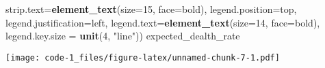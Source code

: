 \documentclass[
]{article}
\newenvironment{Shaded}{\begin{snugshade}}{\end{snugshade}}
\newcommand{\AttributeTok}[1]{\textcolor[rgb]{0.13,0.29,0.53}{#1}}
\newcommand{\DecValTok}[1]{\textcolor[rgb]{0.00,0.00,0.81}{#1}}
\newcommand{\FunctionTok}[1]{\textcolor[rgb]{0.13,0.29,0.53}{\textbf{#1}}}
\newcommand{\NormalTok}[1]{#1}
\newcommand{\StringTok}[1]{\textcolor[rgb]{0.31,0.60,0.02}{#1}}
\begin{document}
\begin{Shaded}
\begin{Highlighting}[]
        \AttributeTok{strip.text=}\FunctionTok{element\_text}\NormalTok{(}\AttributeTok{size=}\DecValTok{15}\NormalTok{, }\AttributeTok{face=}\StringTok{\textquotesingle{}bold\textquotesingle{}}\NormalTok{), }\AttributeTok{legend.position=}\StringTok{\textquotesingle{}top\textquotesingle{}}\NormalTok{, }\AttributeTok{legend.justification=}\StringTok{\textquotesingle{}left\textquotesingle{}}\NormalTok{,}
        \AttributeTok{legend.text=}\FunctionTok{element\_text}\NormalTok{(}\AttributeTok{size=}\DecValTok{14}\NormalTok{, }\AttributeTok{face=}\StringTok{\textquotesingle{}bold\textquotesingle{}}\NormalTok{), }\AttributeTok{legend.key.size =} \FunctionTok{unit}\NormalTok{(}\DecValTok{4}\NormalTok{, }\StringTok{"line"}\NormalTok{))}
\NormalTok{expected\_dealth\_rate}
\end{Highlighting}
\end{Shaded}

\texttt{[image: code-1\_files/figure-latex/unnamed-chunk-7-1.pdf]}
\end{document}
